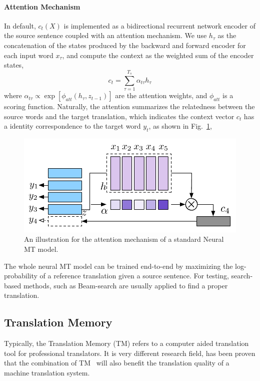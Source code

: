 \documentclass[11pt,letterpaper]{article}
\begin{document}
\paragraph{Attention Mechanism}
In default, $c_t(X)$ is implemented as a bidirectional recurrent network encoder of the source sentence coupled with an attention mechanism. We use $h_\tau$ as the concatenation of the states produced by the backward and forward encoder for each input word $x_\tau$, and compute the context as the weighted sum of the encoder states,
\begin{equation}
c_t = \sum_{\tau=1}^{T_s}\alpha_{t\tau}h_\tau
\end{equation}
where $\alpha_{t\tau} \propto \exp\left[\phi_{att}\left(h_\tau, z_{t-1}\right)\right]$ are the attention weights, and $\phi_{att}$ is a scoring function. Naturally, the attention summarizes the relatedness between the source words and the target translation, which indicates the context vector $c_t$ has a identity correspondence to the target word $y_t$, as shown in Fig.~\ref{fig.nmt}, 
\begin{figure}[htbp]
\centering
\includegraphics[width=0.85\linewidth]{figures/nmt1.pdf}
\caption{\label{fig.nmt}An illustration for the attention mechanism of a standard Neural MT model.  }
\end{figure}

The whole neural MT model can be trained end-to-end by maximizing the log-probability of a reference translation given a source sentence. For testing, search-based methods, such as Beam-search are usually applied to find a proper translation.
\subsection{Translation Memory}
Typically, the Translation Memory (TM) refers to a computer aided translation tool for professional translators.
It is very different research field, has been proven that the combination of TM~\cite{li2016phrase} will also benefit the translation quality of a machine translation system.
\end{document}
